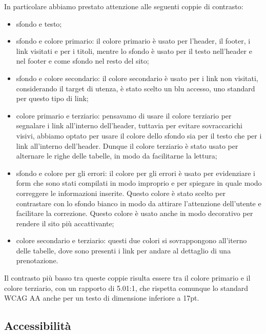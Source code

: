 In particolare abbiamo prestato attenzione alle seguenti coppie di contrasto:
\begin{itemize}
	\item sfondo e testo;

	\item sfondo e colore primario: il colore primario è usato per l'header,
	      il footer, i link visitati e per i titoli, mentre lo sfondo è usato
	      per il testo nell'header e nel footer e come sfondo nel resto del
	      sito;

	\item sfondo e colore secondario: il colore secondario è usato per i link
	      non visitati, considerando il target di utenza, è stato scelto un
	      blu accesso, uno standard per questo tipo di link;

	\item colore primario e terziario: pensavamo di usare il colore
	      terziario per segnalare i link all'interno dell'header,
	      tuttavia per evitare sovraccarichi visivi, abbiamo optato per
	      usare il colore dello sfondo sia per il testo che per i link
	      all'interno dell'header.
	      Dunque il colore terziario è stato usato per alternare le righe
	      delle tabelle, in modo da facilitarne la lettura;

	\item sfondo e colore per gli errori: il colore per gli errori è usato
	      per evidenziare i form che sono stati compilati in modo improprio e
	      per spiegare in quale modo correggere le informazioni inserite.
	      Questo colore è stato scelto per contrastare con lo sfondo bianco
	      in modo da attirare l'attenzione dell'utente e facilitare la
	      correzione. Questo colore è usato anche in modo decorativo per
	      rendere il sito più accattivante;

	\item colore secondario e terziario: questi due colori si sovrappongono
	      all'iterno delle tabelle, dove sono presenti i link per andare al
	      dettaglio di una prenotazione.
\end{itemize}

Il contrasto più basso tra queste coppie risulta essere tra il colore primario
e il colore terziario, con un rapporto di 5.01:1, che rispetta comunque lo
standard WCAG AA anche per un testo di dimensione inferiore a 17pt.

\subsection{Accessibilità}

